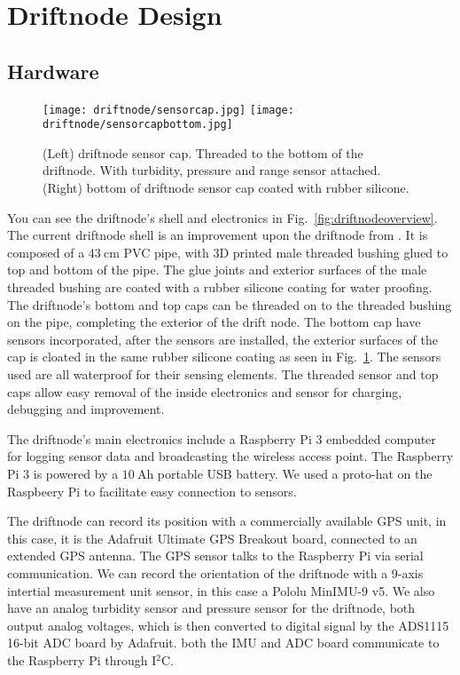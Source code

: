 \section[Design]{Driftnode Design}

\subsection[Hardware]{Hardware}

\begin{figure}[h]
	\begin{center}
	\texttt{[image: driftnode/sensorcap.jpg]}
	\texttt{[image: driftnode/sensorcapbottom.jpg]}
	\caption[Driftnode]{
		(Left) driftnode sensor cap. Threaded to the bottom of the driftnode. With turbidity, pressure and range sensor attached.
		(Right) bottom of driftnode sensor cap coated with rubber silicone.
	} \label{fig:sensorcap}
	\end{center}
	\vspace{-1em}
\end{figure}

You can see the driftnode's shell and electronics in Fig.~\ref{fig:driftnodeoverview}.
The current driftnode shell is an improvement upon the driftnode from \cite{drifterUSC}.
It is composed of a $\SI{43}{\centi\metre}$ PVC pipe, with 3D printed male threaded bushing glued to top and bottom of the pipe.
The glue joints and exterior surfaces of the male threaded bushing are coated with a rubber silicone coating for water proofing.
The driftnode's bottom and top caps can be threaded on to the threaded bushing on the pipe, completing the exterior of the drift node.
The bottom cap have sensors incorporated, after the sensors are installed, the exterior surfaces of the cap is cloated in the same rubber silicone coating as seen in Fig.~\ref{fig:sensorcap}.
The sensors used are all waterproof for their sensing elements.
The threaded sensor and top caps allow easy removal of the inside electronics and sensor for charging, debugging and improvement.

The driftnode's main electronics include a Raspberry Pi 3 embedded computer for logging sensor data and broadcasting the wireless access point.
The Raspberry Pi 3 is powered by a $\SI{10}{\ampere\hour}$ portable USB battery.
We used a proto-hat on the Raspbeery Pi to facilitate easy connection to sensors.

The driftnode can record its position with a commercially available GPS unit, in this case, it is the Adafruit Ultimate GPS Breakout board, connected to an extended GPS antenna.
The GPS sensor talks to the Raspberry Pi via serial communication.
We can record the orientation of the driftnode with a 9-axis intertial measurement unit sensor, in this case a Pololu MinIMU-9 v5.
We also have an analog turbidity sensor and pressure sensor for the driftnode, both output analog voltages, which is then converted to digital signal by the ADS1115 16-bit ADC board by Adafruit.
both the IMU and ADC board communicate to the Raspberry Pi through I$^{2}$C.

